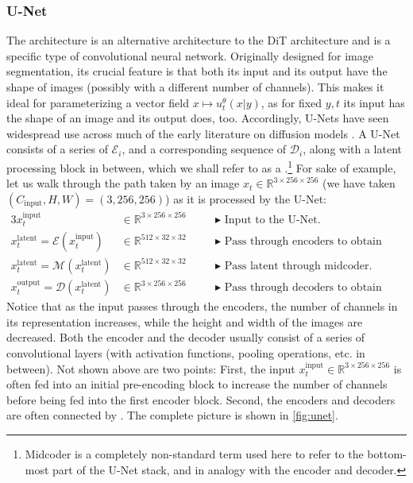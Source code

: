 \subsubsection{U-Net}
The  architecture \citep{ronneberger2015u} is an alternative architecture to the DiT architecture and is a specific type of convolutional neural network. Originally designed for image segmentation, its crucial feature is that both its input and its output have the shape of images (possibly with a different number of channels). This makes it ideal for parameterizing a vector field $x\mapsto u_t^\theta(x|y)$, as for fixed $y,t$ its input has the shape of an image and its output does, too. Accordingly, U-Nets have seen widespread use across much of the early literature on diffusion models \citep{ho2020denoising, unet_cite_1, classifier_guidance}. A U-Net consists of a series of  $\mathcal{E}_i$, and a corresponding sequence of  $\mathcal{D}_i$, along with a latent processing block in between, which we shall refer to as a .\footnote{Midcoder is a completely non-standard term used here to refer to the bottom-most part of the U-Net stack, and in analogy with the encoder and decoder.} For sake of example, let us walk through the path taken by an image $x_t \in \mathbb{R}^{3 \times 256 \times 256}$ (we have taken $(C_{\text{input}}, H, W) = (3, 256, 256)$) as it is processed by the U-Net:
\begin{alignat*}{3}
    x^{\text{input}}_t &\in \mathbb{R}^{3 \times 256 \times 256} \quad  
    && \blacktriangleright\,\,\text{Input to the U-Net.}\\
    x^{\text{latent}}_t = \mathcal{E}(x^{\text{input}}_t) &\in \mathbb{R}^{512 \times 32 \times 32} \quad && \blacktriangleright\,\,\text{Pass through encoders to obtain latent.}\\
    x^{\text{latent}}_t = \mathcal{M}(x^{\text{latent}}_t) &\in \mathbb{R}^{512 \times 32 \times 32} \quad && \blacktriangleright\,\,\text{Pass latent through midcoder.}\\
    x^{\text{output}}_t = \mathcal{D}(x^{\text{latent}}_t) &\in \mathbb{R}^{3 \times 256 \times 256} \quad && \blacktriangleright\,\,\text{Pass through decoders to obtain output.}
\end{alignat*}
Notice that as the input passes through the encoders, the number of channels in its representation increases, while the height and width of the images are decreased. Both the encoder and the decoder usually consist of a series of convolutional layers (with activation functions, pooling operations, etc. in between). Not shown above are two points: First, the input $x^{\text{input}}_t\in \mathbb{R}^{3 \times 256 \times 256}$ is often fed into an initial pre-encoding block to increase the number of channels before being fed into the first encoder block. Second, the encoders and decoders are often connected by . The complete picture is shown in \cref{fig:unet}.
